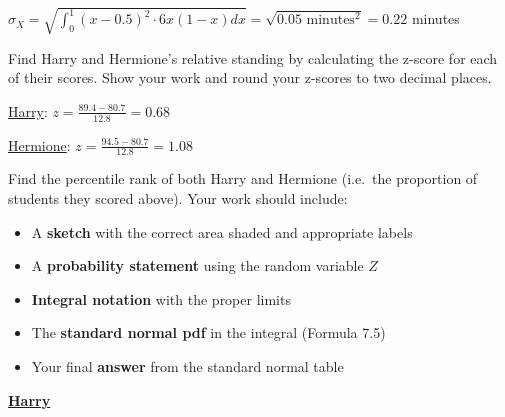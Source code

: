 \documentclass[noanswers]{exam}
\begin{document}
\begin{questions}
\begin{parts}
\begin{solution}[\stretch{1}]
	\vspace{3mm}
	
	$\displaystyle \sigma_X=\sqrt{\int_0^1 (x-0.5)^2\cdot 6x(1-x) dx}=\sqrt{0.05\text{ minutes}^2}=0.22$ minutes
	
	\end{solution}
	
	\end{parts}
	
	
	\newpage
	
\question Find Harry and Hermione's relative standing by calculating the z-score for each of their scores. Show your work and round your z-scores to two decimal places.
		
	\begin{solution}[\stretch{1}]
	
	\vspace{3mm}

	\underline{Harry}: $z=\frac{89.4-80.7}{12.8}=0.68$
	
	\vspace{3mm}
	
	\underline{Hermione}: $z=\frac{94.5-80.7}{12.8}=1.08$
	
	\vspace{3mm}

	\end{solution}
	
	\question Find the percentile rank of both Harry and Hermione (i.e.\ the proportion of students they scored above). Your work should include:
		\begin{itemize}
		\item A \textbf{sketch} with the correct area shaded and appropriate labels
		\item A \textbf{probability statement} using the random variable $Z$
		\item \textbf{Integral notation} with the proper limits
		\item The \textbf{standard normal pdf} in the integral (Formula 7.5)
		\item Your final \textbf{answer} from the standard normal table
		\end{itemize}
		
		\begin{solution}[\stretch{3}]
		
		\vspace{3mm}
		
		\hspace{7mm}\underline{\textbf{Harry}}

		\begin{center}
\end{center}
\end{solution}
\end{questions}
\end{document}

